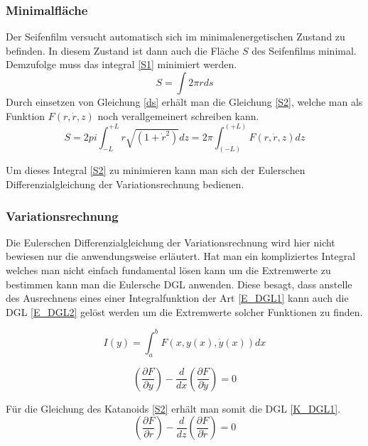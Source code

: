 \begin{refsection}
\subsubsection{Minimalfläche}
Der Seifenfilm versucht automatisch sich im minimalenergetischen Zustand zu befinden. In diesem Zustand ist dann auch die Fläche $S$ des Seifenfilms minimal.
Demzufolge muss das integral \eqref{S1} minimiert werden. 
\begin{equation} \label{S1}  
  S= \int 2 \pi r ds 
\end{equation}
Durch einsetzen von Gleichung \eqref{ds} erhält man die Gleichung \eqref{S2}, welche man als Funktion $F(r,\dot r, z)$ noch verallgemeinert schreiben kann.
\begin{equation} \label{S2}
  S=2 pi \int_{-L}^{+L} r\sqrt{(1+\dot r^2)}dz =2 \pi \int_(-L)^(+L) F(r,\dot r, z) dz 
\end{equation}


Um dieses Integral \eqref{S2} zu minimieren kann man sich der Eulerschen Differenzialgleichung der Variationsrechnung bedienen. 
\subsubsection{Variationsrechnung}
Die Eulerschen Differenzialgleichung der Variationsrechnung wird hier nicht bewiesen nur die anwendungsweise erläutert.
Hat man ein kompliziertes Integral welches man nicht einfach fundamental lösen kann um die Extremwerte zu bestimmen kann man die Eulersche DGL anwenden. Diese besagt, dass anstelle des Ausrechnens eines einer Integralfunktion der Art \eqref{E_DGL1} kann auch die DGL \eqref{E_DGL2} gelöst werden um die Extremwerte solcher Funktionen zu finden.

\begin{equation} \label{E_DGL1}  
  I(y)= \int_a^b F(x,y(x),\dot y(x))dx       
\end{equation}

\begin{equation} \label{E_DGL2}
\left(\frac{\partial F}{\partial y}\right)- \frac{d}{dx} \left(\frac{\partial F}{\partial \dot{y}}\right)=0         
\end{equation}

Für die Gleichung des Katanoids \eqref{S2} erhält man somit die DGL \eqref{K_DGL1}.
\begin{equation} \label{K_DGL1}
\left(\frac{\partial F}{\partial r}\right)- \frac{d}{dz} \left(\frac{\partial F}{\partial \dot{r}}\right)=0    
\end{equation}


\end{refsection}
